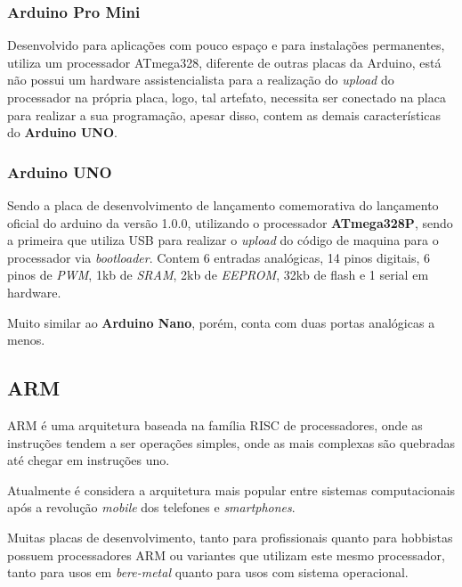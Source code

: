 \subsubsection{Arduino Pro Mini}

Desenvolvido para aplicações com pouco espaço e para instalações permanentes, utiliza um processador ATmega328,  diferente de outras placas da Arduino, está não possui um hardware assistencialista para a realização do \textit{upload} do processador na própria placa, logo, tal artefato, necessita ser conectado na placa para realizar a sua programação, apesar disso, contem as demais características do \textbf{Arduino UNO}.

\subsubsection{Arduino UNO}

Sendo a placa de desenvolvimento de lançamento comemorativa do lançamento oficial do arduino da versão 1.0.0, utilizando o processador \textbf{ATmega328P}, sendo a primeira que utiliza USB para realizar o \textit{upload} do código de maquina para o processador via \textit{bootloader}. Contem 6 entradas analógicas, 14 pinos digitais, 6 pinos de \textit{PWM}, 1kb de \textit{SRAM}, 2kb de \textit{EEPROM}, 32kb de flash e 1 serial em hardware.

Muito similar ao \textbf{Arduino Nano}, porém, conta com duas portas analógicas a menos.


\subsection{ARM}

ARM é uma arquitetura baseada na família RISC de processadores, onde as instruções tendem a ser operações simples, onde as mais complexas são quebradas até chegar em instruções uno.

Atualmente é considera a arquitetura mais popular entre sistemas computacionais após a revolução \textit{mobile} dos telefones e \textit{smartphones}.

Muitas placas de desenvolvimento, tanto para profissionais quanto para hobbistas possuem processadores ARM ou variantes que utilizam este mesmo processador, tanto para usos em \textit{bere-metal} quanto para usos com sistema operacional.

